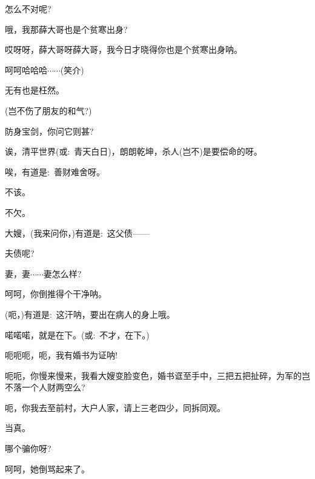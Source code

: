 {{{{怎么不对呢?}

{哦，我那薛大哥也是个贫寒出身?}

{哎呀呀，薛大哥呀薛大哥，我今日才晓得你也是个贫寒出身呐。}

{呵呵哈哈哈$\cdots{}\cdots{}$({\hwfs 笑}{\hwfs 介})}


{无有也是枉然。}

{(岂不伤了朋友的和气?)}

{防身宝剑，你问它则甚?}

{诶，清平世界({\akai 或}:~青天白日)，朗朗乾坤，杀人(岂不)是要偿命的呀。}

{唉，有道是:~善财难舍呀。}


{不该。}

{不欠。}

{大嫂，(我来问你，)有道是:~这父债------}

{夫债呢?}

{妻，妻$\cdots{}\cdots{}$妻怎么样?}

{呵呵，你倒推得个干净呐。}

{(呃，)有道是:~这汗呐，要出在病人的身上哦。}


{喏喏喏，就是在下。({\akai 或}:~不才，在下。)}

{呃呃呃，呃，我有婚书为证呐!}

呃呃，你慢来慢来，我看大嫂变脸变色，婚书诓至手中，三把五把扯碎，为军的岂不落一个人财两空么?

呃，你我去至前村，大户人家，请上三老四少，同拆同观。

当真。

哪个骗你呀?

{呵呵，她倒骂起来了。}

{ }




}}}
